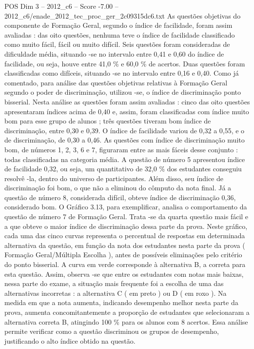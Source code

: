 \begin{textsample}{POS Dim 3 – 2012\_c6 – Score -7.00 – 2012\_c6/enade\_2012\_tec\_proc\_ger\_2c09315dc6.txt}
As questões objetivas do componente de Formação Geral, segundo o índice de facilidade, foram assim avaliadas : das oito questões, nenhuma teve o índice de facilidade classificado como muito fácil, fácil ou muito difícil.
Seis questões foram consideradas de dificuldade média, situando -se no intervalo entre 0,41 e 0,60 do índice de facilidade, ou seja, houve entre 41,0 \% e 60,0 \% de acertos.
Duas questões foram classificadas como difíceis, situando -se no intervalo entre 0,16 e 0,40.
Como já comentado, para análise das questões objetivas relativas à Formação Geral segundo o poder de discriminação, utilizou -se, o índice de discriminação ponto bisserial.
Nesta análise as questões foram assim avaliadas : cinco das oito questões apresentaram índices acima de 0,40 e, assim, foram classificadas com índice muito bom para esse grupo de alunos ; três questões tiveram bom índice de discriminação, entre 0,30 e 0,39.
O índice de facilidade variou de 0,32 a 0,55, e o de discriminação, de 0,30 a 0,46.
As questões com índice de discriminação muito bom, de números 1, 2, 3, 6 e 7, figuraram entre as mais fáceis desse conjunto : todas classificadas na categoria média.
A questão de número 5 apresentou índice de facilidade 0,32, ou seja, um quantitativo de 32,0 \% dos estudantes conseguiu resolvê -la, dentro do universo de participantes.
Além disso, seu índice de discriminação foi bom, o que não a eliminou do cômputo da nota final.
Já a questão de número 8, considerada difícil, obteve índice de discriminação 0,36, considerado bom.
O Gráfico 3.13, para exemplificar, analisa o comportamento da questão de número 7 de Formação Geral.
Trata -se da quarta questão mais fácil e a que obteve o maior índice de discriminação dessa parte da prova.
Neste gráfico, cada uma das cinco curvas representa o percentual de respostas em determinada alternativa da questão, em função da nota dos estudantes nesta parte da prova ( Formação Geral/Múltipla Escolha ), antes de possíveis eliminações pelo critério do ponto bisserial.
A curva em verde corresponde à alternativa B, a correta para esta questão.
Assim, observa -se que entre os estudantes com notas mais baixas, nessa parte do exame, a situação mais frequente foi a escolha de uma das alternativas incorretas : a alternativa C ( em preto ) ou D ( em roxo ).
Na medida em que a nota aumenta, indicando desempenho melhor nesta parte da prova, aumenta concomitantemente a proporção de estudantes que selecionaram a alternativa correta B, atingindo 100 \% para os alunos com 8 acertos.
Essa análise permite verificar como a questão discriminou os grupos de desempenho, justificando o alto índice obtido na questão.

\end{textsample}
